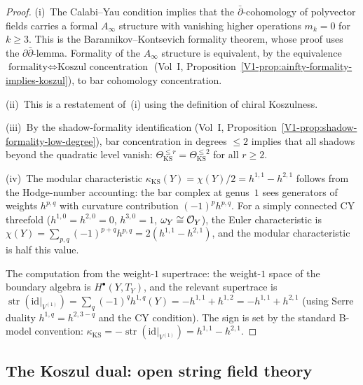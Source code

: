 \begin{proof}
(i)~The Calabi--Yau condition implies that the $\bar\partial$-cohomology
of polyvector fields carries a formal $A_\infty$ structure with
vanishing higher operations $m_k=0$ for $k\ge 3$. This is the
Barannikov--Kontsevich formality theorem, whose proof uses the
$\partial\bar\partial$-lemma. Formality of the $A_\infty$
structure is equivalent, by the equivalence
$\text{formality}\Leftrightarrow\text{Koszul concentration}$
(Vol~I, Proposition~\ref*{V1-prop:ainfty-formality-implies-koszul}),
to bar cohomology concentration.

(ii)~This is a restatement of~(i) using the definition of
chiral Koszulness.

(iii)~By the shadow-formality identification
(Vol~I, Proposition~\ref*{V1-prop:shadow-formality-low-degree}),
bar concentration in degrees $\le 2$ implies that all shadows
beyond the quadratic level vanish: $\Theta^{\le r}_{\mathrm{KS}}
= \Theta^{\le 2}_{\mathrm{KS}}$ for all $r\ge 2$.

(iv)~The modular characteristic $\kappa_{\mathrm{KS}}(Y)
= \chi(Y)/2 = h^{1,1} - h^{2,1}$ follows from the
Hodge-number accounting: the bar complex at genus~$1$ sees
generators of weights $h^{p,q}$ with curvature contribution
$(-1)^p h^{p,q}$. For a simply connected CY threefold
($h^{1,0}=h^{2,0}=0$, $h^{3,0}=1$, $\omega_Y\cong\mathcal O_Y$),
the Euler characteristic is
$\chi(Y) = \sum_{p,q}(-1)^{p+q}h^{p,q} = 2(h^{1,1}-h^{2,1})$,
and the modular characteristic is half this value.

The computation from the weight-$1$ supertrace:
the weight-$1$ space of the boundary algebra is
$H^\bullet(Y,T_Y)$, and the relevant supertrace is
$\operatorname{str}(\mathrm{id}|_{V^{(1)}})
= \sum_q (-1)^q h^{1,q}(Y)
= -h^{1,1} + h^{1,2}
= -h^{1,1} + h^{2,1}$
(using Serre duality $h^{1,q} = h^{2,3-q}$ and the CY condition).
The sign is set by the standard B-model convention:
$\kappa_{\mathrm{KS}} = -\operatorname{str}(\mathrm{id}|_{V^{(1)}})
= h^{1,1} - h^{2,1}$.
\end{proof}


\subsection{The Koszul dual: open string field theory}

